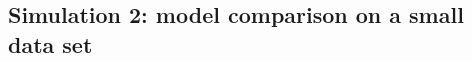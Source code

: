 \documentclass[12pt]{article}
\begin{document}





\subsection{Simulation 2: model comparison on a small data set}
\end{document}
